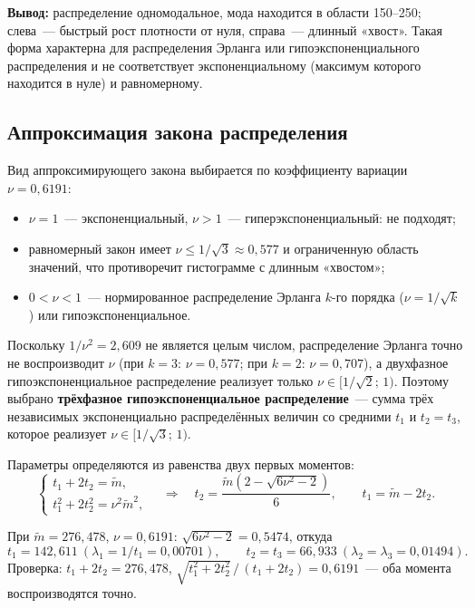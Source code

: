 \documentclass[a4paper,12pt]{article}
\begin{document}
\textbf{Вывод:} распределение одномодальное, мода находится в области 150--250; слева~--- быстрый рост плотности от нуля, справа~--- длинный «хвост». Такая форма характерна для распределения Эрланга или гипоэкспоненциального распределения и не соответствует экспоненциальному (максимум которого находится в нуле) и равномерному.

\subsection{Аппроксимация закона распределения}
Вид аппроксимирующего закона выбирается по коэффициенту вариации $\nu=0{,}6191$:
\begin{itemize}
  \item $\nu=1$~--- экспоненциальный, $\nu>1$~--- гиперэкспоненциальный: не подходят;
  \item равномерный закон имеет $\nu\le 1/\sqrt3\approx0{,}577$ и ограниченную область значений, что противоречит гистограмме с длинным «хвостом»;
  \item $0<\nu<1$~--- нормированное распределение Эрланга $k$-го порядка ($\nu=1/\sqrt k$) или гипоэкспоненциальное.
\end{itemize}

Поскольку $1/\nu^2=2{,}609$ не является целым числом, распределение Эрланга точно не воспроизводит $\nu$ (при $k=3$: $\nu=0{,}577$; при $k=2$: $\nu=0{,}707$), а двухфазное гипоэкспоненциальное распределение реализует только $\nu\in[1/\sqrt2;\,1)$. Поэтому выбрано \textbf{трёхфазное гипоэкспоненциальное распределение}~--- сумма трёх независимых экспоненциально распределённых величин со средними $t_1$ и $t_2=t_3$, которое реализует $\nu\in[1/\sqrt3;\,1)$.

Параметры определяются из равенства двух первых моментов:
\begin{equation}
\begin{cases}
t_1+2t_2=\tilde m,\\
t_1^2+2t_2^2=\nu^2\tilde m^2,
\end{cases}
\quad\Rightarrow\quad
t_2=\frac{\tilde m\left(2-\sqrt{6\nu^2-2}\right)}{6},\qquad t_1=\tilde m-2t_2 .
\end{equation}

При $\tilde m=276{,}478$, $\nu=0{,}6191$: $\sqrt{6\nu^2-2}=0{,}5474$, откуда
\[
t_1=142{,}611\ (\lambda_1=1/t_1=0{,}00701),\qquad t_2=t_3=66{,}933\ (\lambda_2=\lambda_3=0{,}01494).
\]
Проверка: $t_1+2t_2=276{,}478$, $\sqrt{t_1^2+2t_2^2}\,/\,(t_1+2t_2)=0{,}6191$~--- оба момента воспроизводятся точно.
\end{document}
